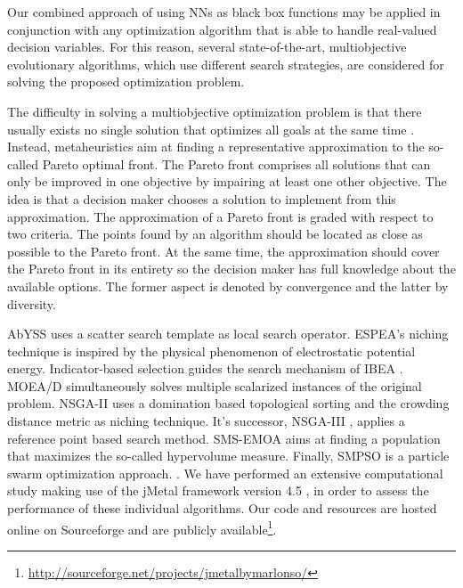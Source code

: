 Our combined approach of using NNs as black box functions may be applied in conjunction with any optimization algorithm that is able to handle real-valued decision variables. For this reason, several state-of-the-art, multiobjective evolutionary algorithms, which use different search strategies, are considered for solving the proposed optimization problem.

The difficulty in solving a multiobjective optimization problem is that there usually exists no single solution that optimizes all goals at the same time \cite{basicDeb,basicCoello}. Instead, metaheuristics aim at finding a representative approximation to the so-called Pareto optimal front. The Pareto front comprises all solutions that can only be improved in one objective by impairing at least one other objective. The idea is that a decision maker chooses a solution to implement from this approximation. The approximation of a Pareto front is graded with respect to two criteria. The points found by an algorithm should be located as close as possible to the Pareto front. At the same time, the approximation should cover the Pareto front in its entirety so the decision maker has full knowledge about the available options. The former aspect is denoted by convergence and the latter by diversity.

AbYSS \cite{abyss} uses a scatter search template as local search operator. ESPEA's \cite{espea} niching technique is inspired by the physical phenomenon of electrostatic potential energy. Indicator-based selection guides the search mechanism of IBEA \cite{ibea}. MOEA/D \cite{moead2009} simultaneously solves multiple scalarized instances of the original problem. NSGA-II \cite{nsga2} uses a domination based topological sorting and the crowding distance metric as niching technique. It's successor, NSGA-III \cite{nsga3part1}, applies a reference point based search method. SMS-EMOA \cite{smsemoa} aims at finding a population that maximizes the so-called hypervolume measure. Finally, SMPSO \cite{smpso} is a particle swarm optimization approach. .
%
We have performed an extensive computational study making use of the jMetal framework version 4.5 \cite{jmetal2}, in order to assess the performance of these individual algorithms. Our code and resources are hosted online on Sourceforge and are publicly available\footnote{\url{http://sourceforge.net/projects/jmetalbymarlonso/}}.

